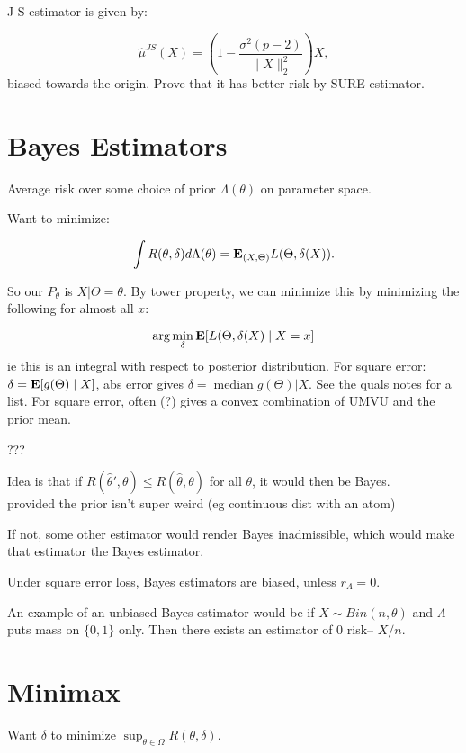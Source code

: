 \documentclass{article}
\begin{document}
J-S estimator is given by:

$$\hat \mu^{JS} (X) = \left ( 1-\frac{\sigma^2(p-2)}{\|X\|_2^2}\right)X,$$
biased towards the origin. Prove that it has better risk by SURE estimator. 

\section{Bayes Estimators}
Average risk over some choice of prior $\Lambda(\theta)$ on parameter space. 

Want to minimize:

$$\int R(\theta, \delta) d\Lambda(\theta) = \mathbf{E}_{(X,\Theta)} L(\Theta, \delta(X)).$$

So our $P_\theta$ is $X|\Theta = \theta$. By tower property, we can minimize this by minimizing the following for almost all $x$:

$$\arg \min_{\delta} \mathbf{E} [L(\Theta, \delta(X) \mid X= x]$$
ie this is an integral with respect to posterior distribution. For square error: $\delta = \mathbf{E}[g(\Theta)\mid X]$, abs error gives $\delta = \operatorname{median} g(\Theta) |X$. See the quals notes for a list. For square error, often (?) gives a convex combination of UMVU and the prior mean. 
\begin{theorem}
???
\end{theorem}
\begin{fact}
Idea is that if $R(\hat \theta ' ,\theta) \leq R(\hat \theta , \theta)$ for all $\theta$, it would then be Bayes. \\ provided the prior isn't super weird (eg continuous dist with an atom) 

\end{fact}

\begin{fact}
If not, some other estimator would render Bayes inadmissible, which would make that estimator the Bayes estimator.
\end{fact}

\begin{fact}
Under square error loss, Bayes estimators are biased, unless $r_\Lambda = 0$.
\end{fact}
An example of an unbiased Bayes estimator would be if $X\sim Bin(n,\theta)$ and $\Lambda$ puts mass on $\{0,1\}$ only. Then there exists an estimator of $0$ risk-- $X/n$. 

\section{Minimax}
Want $\delta$ to minimize $\sup_{\theta \in \Omega} R(\theta, \delta)$. \\\\
\end{document}
